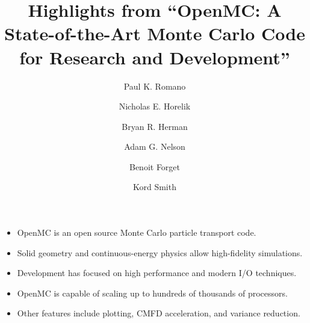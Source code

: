 \documentclass{article}
\begin{document}
\title{Highlights from ``OpenMC: A State-of-the-Art Monte Carlo Code for
  Research and Development''}
\author{Paul K. Romano \and Nicholas E. Horelik \and Bryan R. Herman \and Adam
  G. Nelson \and Benoit Forget \and Kord Smith}
\maketitle

\begin{itemize}
\item OpenMC is an open source Monte Carlo particle transport code.
\item Solid geometry and continuous-energy physics allow high-fidelity simulations.
\item Development has focused on high performance and modern I/O techniques.
\item OpenMC is capable of scaling up to hundreds of thousands of processors.
\item Other features include plotting, CMFD acceleration, and variance reduction.
\end{itemize}
\end{document}
